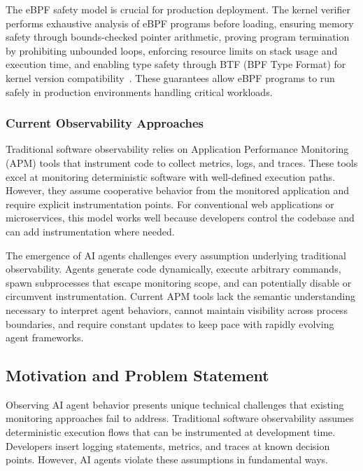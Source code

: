The eBPF safety model is crucial for production deployment. The kernel verifier performs exhaustive analysis of eBPF programs before loading, ensuring memory safety through bounds-checked pointer arithmetic, proving program termination by prohibiting unbounded loops, enforcing resource limits on stack usage and execution time, and enabling type safety through BTF (BPF Type Format) for kernel version compatibility~\cite{kerneldoc}. These guarantees allow eBPF programs to run safely in production environments handling critical workloads.

\subsubsection{Current Observability Approaches}

Traditional software observability relies on Application Performance Monitoring (APM) tools that instrument code to collect metrics, logs, and traces. These tools excel at monitoring deterministic software with well-defined execution paths. However, they assume cooperative behavior from the monitored application and require explicit instrumentation points. For conventional web applications or microservices, this model works well because developers control the codebase and can add instrumentation where needed.

The emergence of AI agents challenges every assumption underlying traditional observability. Agents generate code dynamically, execute arbitrary commands, spawn subprocesses that escape monitoring scope, and can potentially disable or circumvent instrumentation. Current APM tools lack the semantic understanding necessary to interpret agent behaviors, cannot maintain visibility across process boundaries, and require constant updates to keep pace with rapidly evolving agent frameworks.

\subsection{Motivation and Problem Statement}

Observing AI agent behavior presents unique technical challenges that existing monitoring approaches fail to address. Traditional software observability assumes deterministic execution flows that can be instrumented at development time. Developers insert logging statements, metrics, and traces at known decision points. However, AI agents violate these assumptions in fundamental ways.

